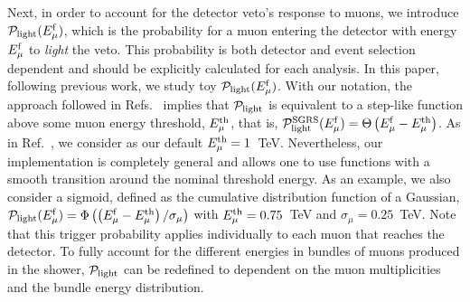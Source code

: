 \documentclass[aps,prd,showpacs,letterpaper,onecolumn,longbibliography,superscriptaddress,notitlepage,nofootinbib]{revtex4-1}%
\newcommand{\Emf}{E_{\mu}^{\rm f}}
\newcommand{\Prob}{{\cal P}}
\begin{document}
Next, in order to account for the detector veto's response to muons, we introduce $\Prob_{\rm light}(\Emf)$, which is the probability for a muon entering the detector with energy $\Emf$ to \textit{light} the veto. This probability is both detector and event selection dependent and should be explicitly calculated for each analysis. In this paper, following previous work, we study toy $\Prob_{\rm light}(\Emf)$.  With our notation, the approach followed in Refs.~\cite{Schonert:2008is, Gaisser:2014bja} implies that $\Prob_{\rm light}$ is equivalent to a step-like function above some muon energy threshold, $E_{\mu}^{\rm th}$, that is, $\Prob_{\rm light}^{\rm SGRS}(\Emf) = \Theta\left(\Emf - E_{\mu}^{\rm th}\right)$. As in Ref.~\cite{Gaisser:2014bja}, we consider as our default $E_{\mu}^{\rm th} = 1$~TeV. Nevertheless, our implementation is completely general and allows one to use functions with a smooth transition around the nominal threshold energy. As an example, we also consider a sigmoid, defined as the cumulative distribution function of a Gaussian, $\Prob_{\rm light}(\Emf) = \Phi\left(\left(\Emf - E_{\mu}^{\rm th}\right)/\sigma_\mu\right)$ with $E_{\mu}^{\rm th} = 0.75$~TeV and $\sigma_\mu = 0.25$~TeV. Note that this trigger probability applies individually to each muon that reaches the detector. To fully account for the different energies in bundles of muons produced in the shower, $\Prob_{\rm light}$ can be redefined to dependent on the muon multiplicities and the bundle energy distribution. 
\end{document}
